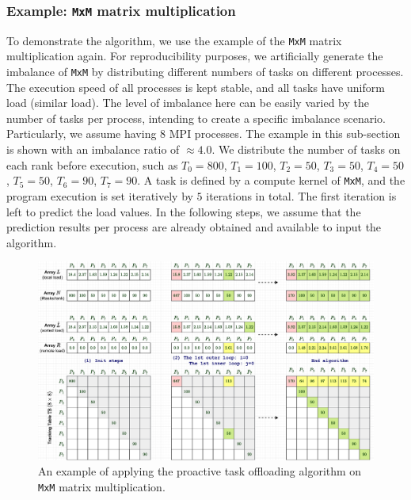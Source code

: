 \subsubsection{Example: \texttt{MxM} matrix multiplication}
\label{subsubsec:mxm-applied-proactlb}

\noindent To demonstrate the algorithm, we use the example of the \texttt{MxM} matrix multiplication again. For reproducibility purposes, we artificially generate the imbalance of \texttt{MxM} by distributing different numbers of tasks on different processes. The execution speed of all processes is kept stable, and all tasks have uniform load (similar load). The level of imbalance here can be easily varied by the number of tasks per process, intending to create a specific imbalance scenario. Particularly, we assume having $8$ MPI processes. The example in this sub-section is shown with an imbalance ratio of $\approx 4.0$. We distribute the number of tasks on each rank before execution, such as $T_{0}=800$, $T_{1}=100$, $T_{2}=50$, $T_{3}=50$, $T_{4}=50$, $T_{5}=50$, $T_{6}=90$, $T_{7}=90$. A task is defined by a compute kernel of \texttt{MxM}, and the program execution is set iteratively by $5$ iterations in total. The first iteration is left to predict the load values. In the following steps, we assume that the prediction results per process are already obtained and available to input the algorithm.\\

\begin{figure}[t]
  \centering
  \includegraphics[scale=0.475]{./pictures/padlb_approach/padlb_proact_taskoffload_mxm_example.pdf}
	\caption{An example of applying the proactive task offloading algorithm on \texttt{MxM} matrix multiplication.}
	\label{fig:example_proact_offload_mxm}
\end{figure}

